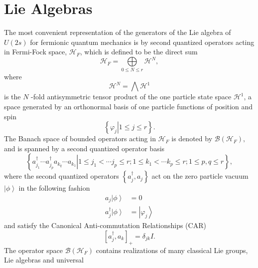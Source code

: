 \documentclass[12pt,aps,amsfonts,amssymb,tightenlines]{revtex4}%
\begin{document}
\section{Lie Algebras\label{liealg}}

The most convenient representation of the generators of the Lie algebra of
$U(2s)$ for fermionic quantum mechanics is by second quantized operators
acting in Fermi-Fock space, $\mathcal{H}_{F}$, which is defined to be the
direct sum
\begin{equation}
\mathcal{H}_{F}=%
{\textstyle\bigoplus\limits_{0\leq N\leq r}}
\mathcal{H}^{N},
\end{equation}
where
\begin{equation}
\mathcal{H}^{N}=%
{\textstyle\bigwedge}
\mathcal{H}^{1}%
\end{equation}
is the $N$ -fold antisymmetric tensor product of the one particle state space
$\mathcal{H}^{1}$, a space generated by an orthonormal basis of one particle
functions of position and spin
\begin{equation}
\left\{  \left.  \varphi_{j}\right\vert 1\leq j\leq r\right\}  .
\end{equation}
The Banach space \cite{Encyclo} of bounded operators acting in $\mathcal{H}%
_{F}$ is denoted by $\mathcal{B}\left(  \mathcal{H}_{F}\right)  ,$ and is
spanned by a second quantized operator basis
\begin{equation}
\left\{  \left.  a_{j_{1}}^{\dagger}\cdots a_{j_{p}}^{\dagger}a_{k_{q}}\cdots
a_{k_{1}}\right\vert 1\leq j_{1}<\cdots j_{p}\leq r;1\leq k_{1}<\cdots
k_{p}\leq r;1\leq p,q\leq r\right\}  ,
\end{equation}
where the second quantized operators $\left\{  a_{j}^{\dagger},a_{j}\right\}
$ act on the zero particle vacuum $\left\vert \phi\right\rangle $ in the
following fashion%
\begin{align}
a_{j}\left\vert \phi\right\rangle  &  =0\nonumber\\
a_{j}^{\dagger}\left\vert \phi\right\rangle  &  =\left\vert \varphi
_{j}\right\rangle
\end{align}
and satisfy the Canonical Anti-commutation Relationships (CAR)
\begin{equation}
\left[  a_{j}^{\dagger},a_{k}\right]  _{+}=\delta_{jk}I.
\end{equation}
The operator space $\mathcal{B}\left(  \mathcal{H}_{F}\right)  $ contains
realizations of many classical Lie groups, Lie algebras and universal
\end{document}
